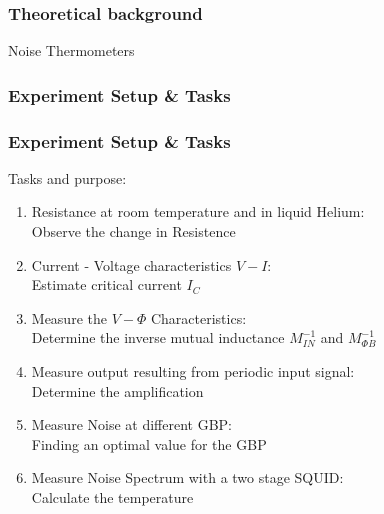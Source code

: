 \documentclass[16pt]{beamer}
\begin{document}
	\begin{frame}
		\frametitle{Theoretical background}
		Noise Thermometers

	\end{frame}

	\begin{frame}
		\frametitle{Experiment Setup \& Tasks}

	\end{frame}

	\begin{frame}
		\frametitle{Experiment Setup \& Tasks}
		Tasks and purpose:
		\begin{enumerate}
			\item Resistance at room temperature and in liquid Helium:\\
			Observe the change in Resistence
			\item Current - Voltage characteristics $V-I$: \\
			Estimate critical current $I_C$
			\item Measure the $V-\Phi$ Characteristics:\\
			Determine the inverse mutual inductance $ M_{IN}^{-1}$ and $M_{\Phi B}^{-1}$
			\item Measure output resulting from  periodic input signal: \\
			Determine the amplification
			\item Measure Noise at different GBP:\\
			Finding an optimal value for the GBP
			\item Measure Noise Spectrum with a two stage SQUID: \\
			Calculate the temperature
			
		\end{enumerate}
	\end{frame}
		
\end{document}
